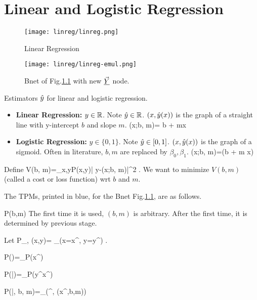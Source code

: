 \chapter{Linear and Logistic Regression}

\begin{figure}[h!]
\centering
\texttt{[image: linreg/linreg.png]}
\caption{Linear Regression} 
\label{fig-linreg}
\end{figure}

\begin{figure}[h!]
\centering
\texttt{[image: linreg/linreg-emul.png]}
\caption{Bnet of Fig.\ref{fig-linreg}  with new $\vec{\underline{Y}}$ node.}\label{fig-linreg-emul}
\end{figure}



Estimators ${\hat{y}}$ for linear and logistic regression.
\begin{itemize}
\item 

\textbf{Linear Regression:} $y\in { \mathbb{R}}$. 
Note ${\hat{y}}\in { \mathbb{R}}$. $(x,{\hat{y}}(x))$ is
the graph
of a straight line 
with y-intercept $b$ and slope $m$.
\beq
\haty(x;b, m)= b + mx
\eeq

\item
\textbf{Logistic Regression:} $y\in\{0, 1\}$. Note ${\hat{y}}\in [0,1]$. $
(x,{\hat{y}}(x))$ is the graph
of a sigmoid.
 Often in literature, $b,m$ are replaced by $\beta_0, \beta_1$. 
\beq
\haty(x;b, m)=\smoid(b + m x)
\eeq
\end{itemize}

Define
\beq
V(b, m)=\sum_{x,y}P(x,y)| y-\haty(x;b, m)|^2
\;.\label{eq-norm-cost}
\eeq
We want to minimize $V(b,m)$ (called a cost or loss function) wrt $b$ and $m$.


The TPMs, printed in blue, for the
Bnet Fig.\ref{fig-linreg}, are as follows.

\beq\color{blue}
P(b,m) 
\eeq
The first time it is used, 
$(b,m)$ is arbitrary.
After the first time, it is determined 
by previous stage.

Let 
\beq
P_{\rvx, \rvy}(x,y)=
\sum_\s \indi(x=x^\s, y=y^\s)
\;.
\eeq

\beq\color{blue}
P(\vecx)=\prod_\s P(x^\s)
\eeq

\beq\color{blue}
P(\vecy|\vecx)=\prod_\s P(y^\s\cond x^\s)
\eeq

\beq\color{blue}
P(\vec{\haty}|\vecx, b, m)=\prod_\s \delta(\haty^\s, \haty(x^\s,b,m))
\label{eq-replace1}
\eeq


